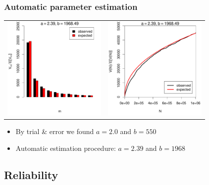\documentclass[t]{beamer} %
\begin{document}
\begin{frame}
  \frametitle{Automatic parameter estimation}

  \begin{center}
    \begin{tabular}{c @{} c}
      \includegraphics[width=50mm]{img/05-estimation-spc-estimated} &
      \includegraphics[width=50mm]{img/05-estimation-vgc-estimated} 
    \end{tabular}
  \end{center}

  \ungap[1]
  \begin{itemize}
    \item By trial \& error we found $a=2.0$ and $b=550$
    \item Automatic estimation procedure: $a=2.39$ and $b=1968$
  \end{itemize}
\end{frame}

\subsection{Reliability}
\end{document}

